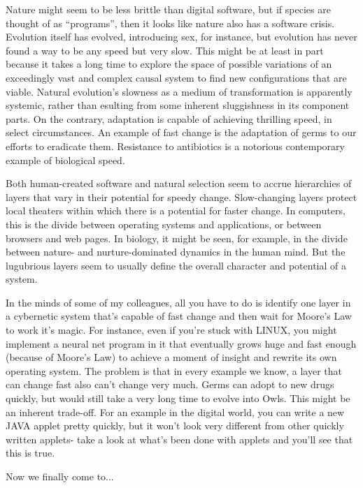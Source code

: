 \documentclass[letterpaper,12pt,english]{sphinxmanual}
\begin{document}
Nature might seem to be less brittle than digital software, but if species are thought of as ``programs'', then it looks like nature also has a software crisis. Evolution itself has evolved, introducing sex, for instance, but evolution has never found a way to be any speed but very slow. This might be at least in part because it takes a long time to explore the space of possible variations of an exceedingly vast and complex causal system to find new configurations that are viable. Natural evolution's slowness as a medium of transformation is apparently systemic, rather than esulting from some inherent sluggishness in its component parts. On the contrary, adaptation is capable of achieving thrilling speed, in select circumstances. An example of fast change is the adaptation of germs to our efforts to eradicate them. Resistance to antibiotics is a notorious contemporary example of biological speed.

Both human-created software and natural selection seem to accrue hierarchies of layers that vary in their potential for speedy change. Slow-changing layers protect local theaters within which there is a potential for faster change. In computers, this is the divide between operating systems and applications, or between browsers and web pages. In biology, it might be seen, for example, in the divide between nature- and nurture-dominated dynamics in the human mind. But the lugubrious layers seem to usually define the overall character and potential of a system.

In the minds of some of my colleagues, all you have to do is identify one layer in a cybernetic system that's capable of fast change and then wait for Moore's Law to work it's magic. For instance, even if you're stuck with LINUX, you might implement a neural net program in it that eventually grows huge and fast enough (because of Moore's Law) to achieve a moment of insight and rewrite its own operating system. The problem is that in every example we know, a layer that can change fast also can't change very much. Germs can adopt to new drugs quickly, but would still take a very long time to evolve into Owls. This might be an inherent trade-off. For an example in the digital world, you can write a new JAVA applet pretty quickly, but it won't look very different from other quickly written applets- take a look at what's been done with applets and you'll see that this is true.

Now we finally come to...
\end{document}
